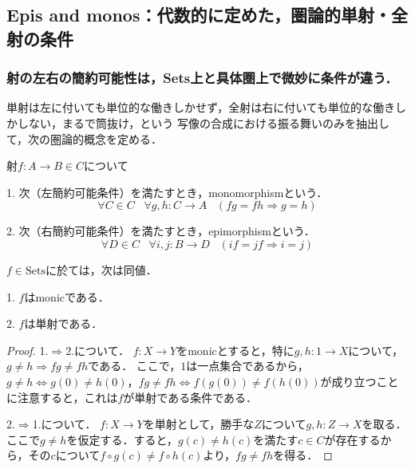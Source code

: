 \documentclass[uplatex, 12pt, dvipdfmx]{jsarticle}
\begin{document}
\subsection{Epis and monos：代数的に定めた，圏論的単射・全射の条件}\label{subsection-monoepi}

\subsubsection{射の左右の簡約可能性は，Sets上と具体圏上で微妙に条件が違う．}

単射は左に付いても単位的な働きしかせず，全射は右に付いても単位的な働きしかしない，まるで筒抜け，という
写像の合成における振る舞いのみを抽出して，次の圏論的概念を定める．
\begin{definition}[圏論的単射・全射]射$f:A\to B\in C$について

    1. 次（左簡約可能条件）を満たすとき，monomorphismという．
    \[ \forall C\in C\;\;\; \forall g,h:C\to A\;\;\; (fg=fh\Rightarrow g=h) \]
    \begin{center}
    \end{center}

    2. 次（右簡約可能条件）を満たすとき，epimorphismという．
    \[ \forall D\in C\;\;\; \forall i,j:B\to D\;\;\; (if=jf\Rightarrow i=j) \]
    \begin{center}
    \end{center}
\end{definition}

\begin{proposition}[Setsでは全射も全写も同値である]
    $f\in \mathrm{Sets}$に於ては，次は同値．

    1. $f$はmonicである．

    2. $f$は単射である．
\end{proposition}
\begin{proof}
    1.$\Rightarrow$2.について．
    $f:X\to Y$をmonicとすると，特に$g,h:1\to X$について，$g\ne h\Rightarrow fg\ne fh$である．
    ここで，$1$は一点集合であるから，$g\ne h\Leftrightarrow g(0)\ne h(0)$，$fg\ne fh\Leftrightarrow f(g(0))\ne f(h(0))$が成り立つことに注意すると，これは$f$が単射である条件である．

    2.$\Rightarrow$1.について．
    $f:X\to Y$を単射として，勝手な$Z$について$g,h:Z\to X$を取る．ここで$g\ne h$を仮定する．すると，$g(c)\ne h(c)$を満たす$c\in C$が存在するから，その$c$について$f\circ g(c)\ne f\circ h(c)$より，$fg\ne fh$を得る．
\end{proof}
\end{document}
